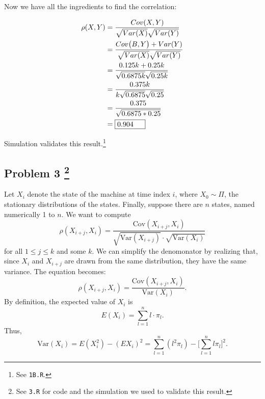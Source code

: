 \documentclass[letter]{article}
\newcounter{foot}
\begin{document}
Now we have all the ingredients to find the correlation:


\begin{equation*}
	\begin{aligned}
	\rho(X,Y) &= \frac{Cov(X, Y)}{\sqrt{Var(X)}\sqrt{Var(Y)}} \\
	       &= \frac{Cov\big(B,Y\big) + Var(Y)}{\sqrt{Var(X)}\sqrt{Var(Y)}} \\
	       &= \frac{0.125k + 0.25k}{\sqrt{0.6875k}\sqrt{0.25k}} \\
	       &= \frac{0.375k}{k\sqrt{0.6875}\sqrt{0.25}} \\
	       &= \frac{0.375}{\sqrt{0.6875*0.25}} \\
	       &= {\fbox {\parbox{0.5in}{0.904}}}\\
	\end{aligned}
\end{equation*}

Simulation validates this result.\footnote{See \texttt{1B.R}.}

\subsection*{Problem 3
\footnote{See \texttt{3.R} for code and the simulation we used to validate this result.}
} 
Let $X_i$ denote the state of the machine at time index $i$, where $X_0  
\sim \Pi$, the stationary distributions of the states. Finally, suppose there are $n$ states, 
named numerically 1 to $n$. We want to compute
$$\rho(X_{i+j}, X_i) = \frac{\text{Cov}(X_{i+j}, X_i)}
                 {\sqrt{\text{Var}(X_{i+j})} \cdot \sqrt{\text{Var}(X_i)}} $$ 
for all $1 \le j \le k$ and some $k$. We can simplify the denomonator by realizing 
that, since $X_i$ and $X_{i+j}$ are drawn from the same distribution, they have
the same variance. The equation becomes: 
$$\rho(X_{i+j}, X_i) = \frac{\text{Cov}(X_{i+j}, X_i)}
                 {\text{Var}(X_{i})}. $$
By definition, the expected value of $X_i$ is
$$ E(X_i) = \sum_{l=1}^n{l\cdot\pi_l}. $$ 
Thus, 
$$ \text{Var}(X_i) = E(X_i^2) - (EX_i)^2 =
  \sum_{l=1}^n{(l^2\pi_l)} - \Big[ \sum_{l=1}^n{l \pi_l} \Big]^2.$$ 
\end{document}
